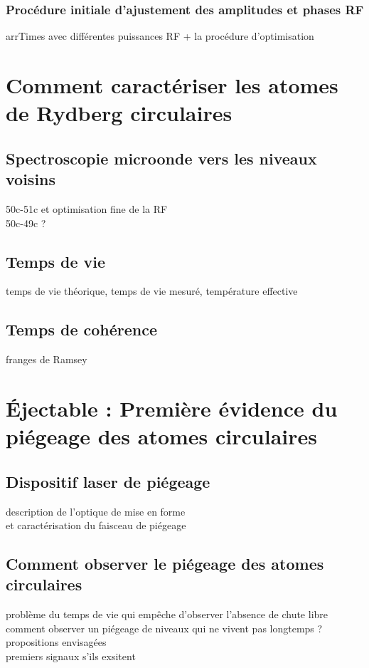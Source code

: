 \subsubsection*{Procédure initiale d'ajustement des amplitudes et phases RF}
		\noindent arrTimes avec différentes puissances RF + la procédure d'optimisation

\section{Comment caractériser les atomes de Rydberg circulaires}
	\subsection{Spectroscopie microonde vers les niveaux voisins}
		\noindent 50c-51c et optimisation fine de la RF\\
		\noindent 50c-49c ?
	\subsection{Temps de vie}
		\noindent temps de vie théorique, temps de vie mesuré, température effective
	\subsection{Temps de cohérence}
		\noindent franges de Ramsey
	


\section{Éjectable : Première évidence du piégeage des atomes circulaires}
	\subsection{Dispositif laser de piégeage}
		\noindent description de l'optique de mise en forme \\
		et caractérisation du faisceau de piégeage
	\subsection{Comment observer le piégeage des atomes circulaires}
		\noindent problème du temps de vie qui empêche d'observer l'absence de chute libre \\
		\noindent comment observer un piégeage de niveaux qui ne vivent pas longtemps ? propositions envisagées\\
		premiers signaux s'ils exsitent
